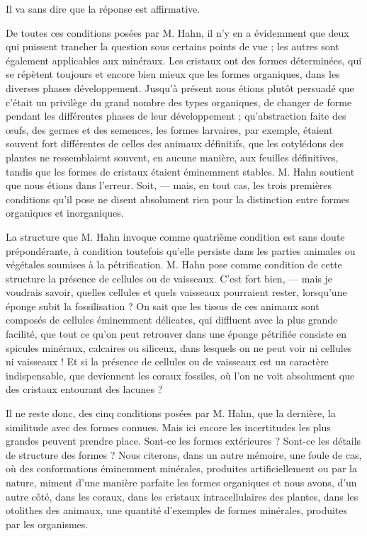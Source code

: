 \documentclass[a4paper, 12pt, oneside, french]{book}
\begin{document}
Il va sans dire que la réponse est affirmative.

De toutes ces conditions posées par M. Hahn, il n'y en a évidemment que deux qui puissent trancher la question sous certains points de vue ; les autres sont également applicables aux minéraux. Les cristaux ont des formes déterminées, qui se répètent toujours et encore bien mieux que les formes organiques, dans les diverses phases développement. Jusqu'à présent nous étions plutôt persuadé que c'était un privilège du grand nombre des types organiques, de changer de forme pendant les différentes phases de leur développement ; qu'abstraction faite des œufs, des germes et des semences, les formes larvaires, par exemple, étaient souvent fort différentes de celles des animaux définitifs, que les cotylédons des plantes ne ressemblaient souvent, en aucune manière, aux feuilles définitives, tandis que les formes de cristaux étaient éminemment stables. M. Hahn soutient que nous étions dans l'erreur. Soit, --- mais, en tout cas, les trois premières conditions qu'il pose ne disent absolument rien pour la distinction entre formes organiques et inorganiques.

La structure que M. Hahn invoque comme quatrième condition est sans doute prépondérante, à condition toutefois qu'elle persiste dans les parties animales ou végétales soumises à la pétrification. M. Hahn pose comme condition de cette structure la présence de cellules ou de vaisseaux. C'est fort bien, --- mais je voudrais savoir, quelles cellules et quels vaisseaux pourraient rester, lorsqu'une éponge subit la fossilisation ? On sait que les tissus de ces animaux sont composés de cellules éminemment délicates, qui diffluent avec la plus grande facilité, que tout ce qu'on peut retrouver dans une éponge pétrifiée consiste en spicules minéraux, calcaires ou siliceux, dans lesquels on ne peut voir ni cellules ni vaisseaux ! Et si la présence de cellules ou de vaisseaux est un caractère indispensable, que deviennent les coraux fossiles, où l'on ne voit absolument que des cristaux entourant des lacunes ?

Il ne reste donc, des cinq conditions posées par M. Hahn, que la dernière, la similitude avec des formes connues. Mais ici encore les incertitudes les plus grandes peuvent prendre place. Sont-ce les formes extérieures ? Sont-ce les détails de structure des formes ? Nous citerons, dans un autre mémoire, une foule de cas, où des conformations éminemment minérales, produites artificiellement ou par la nature, miment d'une manière parfaite les formes organiques et nous avons, d'un autre côté, dans les coraux, dans les cristaux intracellulaires des plantes, dans les otolithes des animaux, une quantité d'exemples de formes minérales, produites par les organismes.
\end{document}

